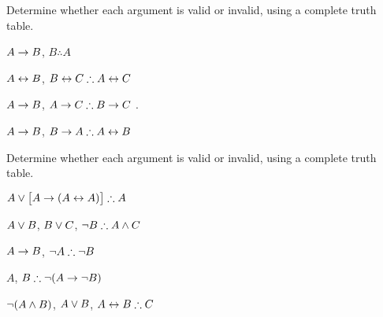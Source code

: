\noindent\problempart
\label{pr.TT.valid2}
Determine whether each argument is valid or invalid, using a complete truth table.
\begin{compactlist}
\item $A\rightarrow B$, $B \therefore  A$ \hfill {}

\item $A\leftrightarrow B$, $B\eiff C \therefore A\eiff C$ \hfill {}

\item $A \rightarrow B$, $A \eif C\therefore B \eif C$ \hfill {}.

\item $A \rightarrow B$, $B \eif A\therefore A \eiff B$ \hfill {} 
\end{compactlist}

\noindent\problempart
\label{pr.TT.valid3}
Determine whether each argument is valid or invalid, using a complete truth table.
\begin{compactlist}
\item $A\eor\bigl[A\eif(A\eiff A)\bigr] \therefore  A $\vspace{.5ex} \hfill {}
\item $A\vee B$, $B\vee C$, $\enot B \therefore A \eand C$\vspace{.5ex} \hfill {}
\item $A \rightarrow B$, $\enot A\therefore \enot B$ \vspace{.5ex} \hfill {}
\item $A$, $B\therefore \enot(A\eif \enot B)$ \vspace{.5ex} \hfill {}
\item $\neg(A \wedge B)$, $A \vee B$, $A \eiff B\therefore C$ \vspace{.5ex} \hfill {}
\end{compactlist}

